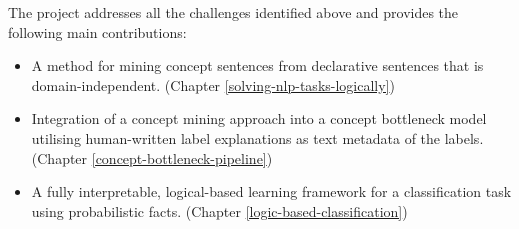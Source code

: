 The project addresses all the challenges identified above and provides the following main contributions:
\begin{itemize}
    \item A method for mining concept sentences from declarative sentences that is domain-independent. (Chapter \ref{solving-nlp-tasks-logically})
    
    \item Integration of a concept mining approach into a concept bottleneck model utilising human-written label explanations as text metadata of the labels. (Chapter \ref{concept-bottleneck-pipeline})
    
    \item A fully interpretable, logical-based learning framework for a classification task using probabilistic facts. (Chapter \ref{logic-based-classification})
\end{itemize}

